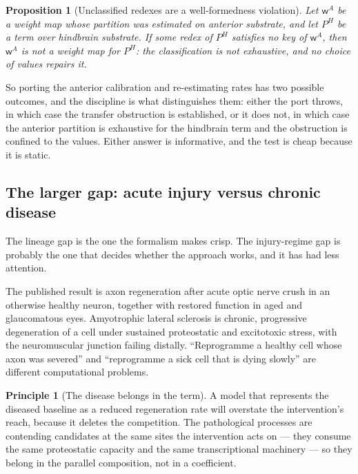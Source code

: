 \documentclass[11pt,a4paper]{article}
\theoremstyle{plain}
\newtheorem{proposition}[theorem]{Proposition}
\theoremstyle{definition}
\newtheorem{principle}[theorem]{Principle}
\theoremstyle{remark}
\newcommand{\wmap}{\mathsf{w}}
\begin{document}
\begin{proposition}[Unclassified redexes are a well-formedness violation]
\label{prop:wf}
Let $\wmap^{A}$ be a weight map whose partition was estimated on anterior
substrate, and let $P^{H}$ be a term over hindbrain substrate. If some redex
of $P^{H}$ satisfies no key of $\wmap^{A}$, then $\wmap^{A}$ is not a weight
map for $P^{H}$: the classification is not exhaustive, and no choice of values
repairs it.
\end{proposition}

So porting the anterior calibration and re-estimating rates has two possible
outcomes, and the discipline is what distinguishes them: either the port
throws, in which case the transfer obstruction is established, or it does not,
in which case the anterior partition is exhaustive for the hindbrain term and
the obstruction is confined to the values. Either answer is informative, and
the test is cheap because it is static.

\subsection{The larger gap: acute injury versus chronic disease}

The lineage gap is the one the formalism makes crisp. The injury-regime gap is
probably the one that decides whether the approach works, and it has had less
attention.

The published result is axon regeneration after acute optic nerve crush in an
otherwise healthy neuron, together with restored function in aged and
glaucomatous eyes. Amyotrophic lateral sclerosis is chronic, progressive
degeneration of a cell under sustained proteostatic and excitotoxic stress,
with the neuromuscular junction failing distally. ``Reprogramme a healthy cell
whose axon was severed'' and ``reprogramme a sick cell that is dying slowly''
are different computational problems.

\begin{principle}[The disease belongs in the term]\label{prin:disease}
A model that represents the diseased baseline as a reduced regeneration rate
will overstate the intervention's reach, because it deletes the competition.
The pathological processes are contending candidates at the same sites the
intervention acts on --- they consume the same proteostatic capacity and the
same transcriptional machinery --- so they belong in the parallel composition,
not in a coefficient.
\end{principle}
\end{document}
